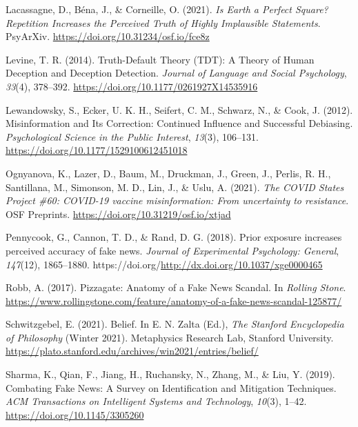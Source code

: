 \documentclass[10pt, letterpaper]{article}
\newenvironment{CSLReferences}%
  {}%
  {\par}
\begin{document}
\begin{CSLReferences}
\leavevmode\hypertarget{ref-lacassagne.etal2021}{}%
Lacassagne, D., Béna, J., \& Corneille, O. (2021). \emph{Is {Earth} a
{Perfect} {Square}? {Repetition} {Increases} the {Perceived} {Truth} of
{Highly} {Implausible} {Statements}}. PsyArXiv.
\url{https://doi.org/10.31234/osf.io/fce8z}

\leavevmode\hypertarget{ref-levine2014}{}%
Levine, T. R. (2014). Truth-{Default} {Theory} ({TDT}): {A} {Theory} of
{Human} {Deception} and {Deception} {Detection}. \emph{Journal of
Language and Social Psychology}, \emph{33}(4), 378--392.
\url{https://doi.org/10.1177/0261927X14535916}

\leavevmode\hypertarget{ref-lewandowsky.etal2012}{}%
Lewandowsky, S., Ecker, U. K. H., Seifert, C. M., Schwarz, N., \& Cook,
J. (2012). Misinformation and {Its} {Correction}: {Continued}
{Influence} and {Successful} {Debiasing}. \emph{Psychological Science in
the Public Interest}, \emph{13}(3), 106--131.
\url{https://doi.org/10.1177/1529100612451018}

\leavevmode\hypertarget{ref-ognyanova.etal2021}{}%
Ognyanova, K., Lazer, D., Baum, M., Druckman, J., Green, J., Perlis, R.
H., Santillana, M., Simonson, M. D., Lin, J., \& Uslu, A. (2021).
\emph{The {COVID} {States} {Project} \#60: {COVID}-19 vaccine
misinformation: {From} uncertainty to resistance}. OSF Preprints.
\url{https://doi.org/10.31219/osf.io/xtjad}

\leavevmode\hypertarget{ref-pennycook.etal2018}{}%
Pennycook, G., Cannon, T. D., \& Rand, D. G. (2018). Prior exposure
increases perceived accuracy of fake news. \emph{Journal of Experimental
Psychology: General}, \emph{147}(12), 1865--1880.
https://doi.org/\url{http://dx.doi.org/10.1037/xge0000465}

\leavevmode\hypertarget{ref-robb2017}{}%
Robb, A. (2017). Pizzagate: {Anatomy} of a {Fake} {News} {Scandal}. In
\emph{Rolling Stone}.
\url{https://www.rollingstone.com/feature/anatomy-of-a-fake-news-scandal-125877/}

\leavevmode\hypertarget{ref-schwitzgebel2021}{}%
Schwitzgebel, E. (2021). Belief. In E. N. Zalta (Ed.), \emph{The
{Stanford} {Encyclopedia} of {Philosophy}} (Winter 2021). Metaphysics
Research Lab, Stanford University.
\url{https://plato.stanford.edu/archives/win2021/entries/belief/}

\leavevmode\hypertarget{ref-sharma.etal2019}{}%
Sharma, K., Qian, F., Jiang, H., Ruchansky, N., Zhang, M., \& Liu, Y.
(2019). Combating {Fake} {News}: {A} {Survey} on {Identification} and
{Mitigation} {Techniques}. \emph{ACM Transactions on Intelligent Systems
and Technology}, \emph{10}(3), 1--42.
\url{https://doi.org/10.1145/3305260}


\end{CSLReferences}
\end{document}
